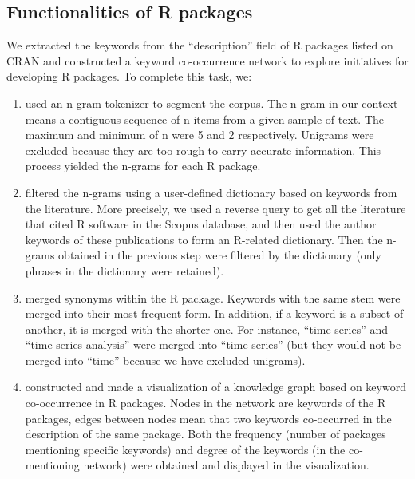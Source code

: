 \hypertarget{functionalities-of-r-packages}{%
\subsection{Functionalities of R
packages}\label{functionalities-of-r-packages}}

We extracted the keywords from the ``description'' field of R packages
listed on CRAN and constructed a keyword co-occurrence network to
explore initiatives for developing R packages. To complete this task,
we:

\begin{enumerate}
\def\labelenumi{(\arabic{enumi})}
\tightlist
\item
  used an n-gram tokenizer to segment the corpus. The n-gram in our
  context means a contiguous sequence of n items from a given sample of
  text. The maximum and minimum of n were 5 and 2 respectively. Unigrams
  were excluded because they are too rough to carry accurate
  information. This process yielded the n-grams for each R package.
\item
  filtered the n-grams using a user-defined dictionary based on keywords
  from the literature. More precisely, we used a reverse query to get
  all the literature that cited R software in the Scopus database, and
  then used the author keywords of these publications to form an
  R-related dictionary. Then the n-grams obtained in the previous step
  were filtered by the dictionary (only phrases in the dictionary were
  retained).
\item
  merged synonyms within the R package. Keywords with the same stem were
  merged into their most frequent form. In addition, if a keyword is a
  subset of another, it is merged with the shorter one. For instance,
  ``time series'' and ``time series analysis'' were merged into ``time
  series'' (but they would not be merged into ``time'' because we have
  excluded unigrams).
\item
  constructed and made a visualization of a knowledge graph based on
  keyword co-occurrence in R packages. Nodes in the network are keywords
  of the R packages, edges between nodes mean that two keywords
  co-occurred in the description of the same package. Both the frequency
  (number of packages mentioning specific keywords) and degree of the
  keywords (in the co-mentioning network) were obtained and displayed in
  the visualization.
\end{enumerate}

